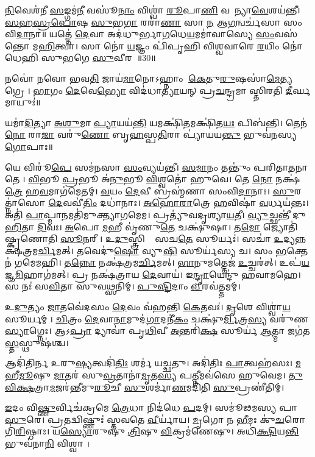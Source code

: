 \ul{𑌨𑌿}𑌵𑍇𑌶॑𑌨𑍀 \ul{𑌸}𑌙𑍍𑌗𑌮॑\ul{𑌨𑍀} 𑌵𑌸𑍂॑\ul{𑌨𑌾𑌂} 𑌵𑌿𑌶𑍍𑌵𑌾॑ \ul{𑌰𑍂}𑌪𑌾\ul{𑌣𑌿} 𑌵𑌸𑍂᳚𑌨𑍍𑌯𑌾\ul{𑌵𑍇}𑌶𑌯॑𑌨𑍍𑌤𑍀। 
\ul{𑌸}\ul{𑌹}\ul{𑌸𑍍𑌰}\ul{𑌪𑍋}𑌷 \ul{𑌸𑍁}𑌭\ul{𑌗𑌾} 𑌰𑌰𑌾॑\ul{𑌣𑌾} 𑌸𑌾 \ul{𑌨} 𑌆\ul{𑌗}𑌨𑍍𑌵𑌰𑍍𑌚॑𑌸𑌾 𑌸𑌂𑌵𑌿\ul{𑌦𑌾}𑌨𑌾॥ 𑌯𑌤𑍍𑌤𑍇॑ \ul{𑌦𑍇}𑌵𑌾 𑌅𑌦॑𑌧𑍁𑌰𑍍𑌭𑌾\ul{𑌗}𑌧𑍇\ul{𑌯}𑌮𑌮𑌾॑𑌵𑌾𑌸𑍍𑌯𑍇 \ul{𑌸𑌂}𑌵𑌸॑𑌨𑍍𑌤𑍋 𑌮\ul{𑌹𑌿}𑌤𑍍𑌵𑌾। 
𑌸𑌾 𑌨𑍋॑ \ul{𑌯}𑌜𑍍𑌞𑌂 𑌪𑌿॑𑌪𑍃𑌹𑌿 𑌵𑌿𑌶𑍍𑌵𑌵𑌾𑌰𑍇 \ul{𑌰}𑌯𑌿𑌂 𑌨𑍋॑ 𑌧𑍇𑌹𑌿 𑌸𑍁𑌭𑌗𑍇 \ul{𑌸𑍁}𑌵𑍀𑌰𑌮𑍍᳚॥30॥ 

\closesection


𑌨𑌵𑍋॑ 𑌨𑌵𑍋 𑌭𑌵\ul{𑌤𑌿} 𑌜𑌾𑌯॑\ul{𑌮𑌾}𑌨𑍋𑌽𑌹𑍍𑌨𑌾𑌂 \ul{𑌕𑍇}𑌤𑍁\ul{𑌰𑍁}𑌷𑌸𑌾॑\ul{𑌮𑍇}𑌤𑍍𑌯𑌗𑍍𑌰𑍇।
\ul{𑌭𑌾}𑌗𑌂 \ul{𑌦𑍇}𑌵𑍇\ul{𑌭𑍍𑌯𑍋} 𑌵𑌿𑌦॑𑌧𑌾\ul{𑌤𑍍𑌯𑌾}𑌯𑌨𑍍 𑌪𑍍𑌰\ul{𑌚}𑌨𑍍𑌦𑍍𑌰𑌮𑌾𑌸𑍍𑌤𑌿𑌰𑌤𑌿 \ul{𑌦𑍀}𑌰𑍍𑌘𑌮𑌾𑌯𑍁𑌃॑॥

𑌯𑌮𑌾॑\ul{𑌦𑌿}𑌤𑍍𑌯𑌾 \ul{𑌅}\ul{}\ul{𑌶𑍁}𑌮𑌾\ul{𑌪𑍍𑌯𑌾}𑌯𑌯॑\ul{𑌨𑍍𑌤𑌿} 𑌯𑌮𑌕𑍍𑌷𑌿॑\ul{𑌤}𑌮𑌕𑍍𑌷𑌿॑𑌤\ul{𑌯𑌃} 𑌪𑌿𑌬॑𑌨𑍍𑌤𑌿।
𑌤𑍇𑌨॑ \ul{𑌨𑍋} 𑌰𑌾\ul{𑌜𑌾} 𑌵𑌰𑍁॑\ul{𑌣𑍋} 𑌬𑍃\ul{𑌹}𑌸𑍍𑌪\ul{𑌤𑌿}𑌰𑌾 𑌪𑍍𑌯𑌾॑𑌯𑌯\ul{𑌨𑍍𑌤𑍁} 𑌭𑍁𑌵॑𑌨𑌸𑍍𑌯 \ul{𑌗𑍋}𑌪𑌾𑌃॥

𑌯𑍇 𑌵𑌿𑌰𑍂॑\ul{𑌪𑍇} 𑌸𑌮॑𑌨𑌸𑌾 \ul{𑌸𑌂}𑌵𑍍𑌯𑌯॑𑌨𑍍𑌤𑍀। \ul{𑌸}\ul{𑌮𑌾}𑌨𑌂 𑌤𑌨𑍍𑌤𑍁𑌂॑ 𑌪𑌰𑌿𑌤𑌾\ul{𑌤}𑌨𑌾𑌤𑍇।
\ul{𑌵𑌿}𑌭𑍂 \ul{𑌪𑍍𑌰}𑌭𑍂 𑌅॑\ul{𑌨𑍁}𑌭𑍂 \ul{𑌵𑌿}𑌶𑍍𑌵𑌤𑍋॑ 𑌹𑍁𑌵𑍇। 𑌤𑍇 \ul{𑌨𑍋} 𑌨𑌕𑍍𑌷॑\ul{𑌤𑍍𑌰𑍇} 𑌹\ul{𑌵}𑌮𑌾𑌗॑𑌮𑍇𑌤𑌮𑍍।
\ul{𑌵}𑌯𑌂 \ul{𑌦𑍇}𑌵𑍀 𑌬𑍍𑌰𑌹𑍍𑌮॑𑌣𑌾 𑌸𑌂𑌵𑌿\ul{𑌦𑌾}𑌨𑌾𑌃। \ul{𑌸𑍁}𑌰𑌤𑍍𑌨𑌾॑𑌸𑍋 \ul{𑌦𑍇}𑌵𑌵𑍀॑\ul{𑌤𑌿𑌂} 𑌦𑌧𑌾॑𑌨𑌾𑌃।
\ul{𑌅}\ul{𑌹𑍋}\ul{𑌰𑌾}𑌤𑍍𑌰𑍇 \ul{𑌹}𑌵𑌿𑌷𑌾॑ \ul{𑌵}𑌰𑍍𑌧𑌯॑𑌨𑍍𑌤𑌃। 𑌅𑌤𑌿॑ \ul{𑌪𑌾}𑌪𑍍𑌮𑌾\ul{𑌨}𑌮𑌤𑌿॑𑌮𑍁𑌕𑍍𑌤𑍍𑌯𑌾𑌗𑌮𑍇𑌮।
𑌪𑍍𑌰𑌤𑍍𑌯𑍁॑𑌵𑌦𑍃𑌶𑍍𑌯𑌾\ul{𑌯}𑌤𑍀। \ul{𑌵𑍍𑌯𑍁}𑌚𑍍𑌛𑌨𑍍𑌤𑍀॑ 𑌦𑍁\ul{𑌹𑌿}𑌤𑌾 \ul{𑌦𑌿}𑌵𑌃।
\ul{𑌅}𑌪𑍋 \ul{𑌮}𑌹𑍀 𑌵𑍃॑𑌣𑍁\ul{𑌤𑍇} 𑌚𑌕𑍍𑌷𑍁॑𑌷𑌾। 𑌤\ul{𑌮𑍋} 𑌜𑍍𑌯𑍋𑌤𑌿॑𑌷𑍍𑌕𑍃𑌣𑍋𑌤𑌿 \ul{𑌸𑍂}𑌨𑌰𑍀।
𑌉\ul{𑌦𑍁}𑌸𑍍𑌤𑍍𑌰𑌿𑌯𑌾𑌃᳚ 𑌸𑌚\ul{𑌤𑍇} 𑌸𑍂𑌰𑍍𑌯𑌃॑। 𑌸𑌚𑌾॑ \ul{𑌉}𑌦𑍍𑌯𑌨𑍍𑌨𑌕𑍍𑌷॑𑌤𑍍𑌰𑌮\ul{𑌰𑍍𑌚𑌿}𑌮𑌤𑍍।
𑌤𑌵𑍇𑌦𑍁॑\ul{𑌷𑍋} 𑌵𑍍𑌯𑍁\ul{𑌷𑌿} 𑌸𑍂𑌰𑍍𑌯॑𑌸𑍍𑌯 𑌚। 𑌸𑌂 \ul{𑌭}𑌕𑍍𑌤𑍇𑌨॑ 𑌗𑌮𑍇𑌮𑌹𑌿।
𑌤\ul{𑌨𑍍𑌨𑍋} 𑌨𑌕𑍍𑌷॑𑌤𑍍𑌰𑌮\ul{𑌰𑍍𑌚𑌿}𑌮𑌤𑍍। \ul{𑌭𑌾}𑌨𑍁𑌮𑌤𑍍𑌤𑍇𑌜॑ \ul{𑌉}𑌚𑍍𑌚𑌰॑𑌤𑍍।
𑌉𑌪॑\ul{𑌯}𑌜𑍍𑌞\ul{𑌮𑌿}𑌹𑌾𑌗॑𑌮𑌤𑍍।
𑌪𑍍𑌰 𑌨𑌕𑍍𑌷॑𑌤𑍍𑌰𑌾𑌯 \ul{𑌦𑍇}𑌵𑌾𑌯॑। 𑌇\ul{𑌨𑍍𑌦𑍍𑌰𑌾}𑌯𑍇𑌨𑍍𑌦𑍁॑ 𑌹𑌵𑌾𑌮𑌹𑍇।
𑌸 𑌨𑌃॑ 𑌸\ul{𑌵𑌿}𑌤𑌾 𑌸𑍁॑𑌵\ul{𑌥𑍍𑌸}𑌨𑌿𑌮𑍍। \ul{𑌪𑍁}\ul{𑌷𑍍𑌟𑌿}𑌦𑌾𑌂 \ul{𑌵𑍀}𑌰𑌵॑𑌤𑍍𑌤𑌮𑌮𑍍।


𑌉\ul{𑌦𑍁}𑌤𑍍𑌯𑌂 \ul{𑌜𑌾}𑌤𑌵𑍇॑𑌦𑌸𑌂 \ul{𑌦𑍇}𑌵𑌂 𑌵॑𑌹𑌨𑍍𑌤𑌿 \ul{𑌕𑍇}𑌤𑌵𑌃॑। \ul{𑌦𑍃}𑌶𑍇 𑌵𑌿𑌶𑍍𑌵𑌾॑\ul{𑌯} 𑌸𑍂𑌰𑍍𑌯𑌮𑍍।
\ul{𑌚𑌿}𑌤𑍍𑌰𑌂 \ul{𑌦𑍇}𑌵𑌾\ul{𑌨𑌾}𑌮𑍁𑌦॑\ul{𑌗𑌾}𑌦𑌨𑍀॑\ul{𑌕𑌂} 𑌚𑌕𑍍𑌷𑍁॑\ul{𑌰𑍍𑌮𑌿}𑌤𑍍𑌰\ul{𑌸𑍍𑌯} 𑌵𑌰𑍁॑𑌣\ul{𑌸𑍍𑌯𑌾}𑌗𑍍𑌨𑍇𑌃।
𑌆𑌽\ul{𑌪𑍍𑌰𑌾} 𑌦𑍍𑌯𑌾𑌵𑌾॑ 𑌪𑍃\ul{𑌥𑌿}𑌵𑍀 \ul{𑌅}𑌨𑍍𑌤𑌰𑌿॑\ul{𑌕𑍍𑌷}\ul{} 𑌸𑍂𑌰𑍍𑌯॑ \ul{𑌆}𑌤𑍍𑌮𑌾 𑌜𑌗॑𑌤\ul{𑌸𑍍𑌤}𑌸𑍍𑌥𑍁𑌷॑𑌶𑍍𑌚।


𑌆𑌦𑌿॑𑌤𑌿𑌰𑍍𑌨 𑌉𑌰𑍁\ul{𑌷𑍍𑌯}𑌤𑍍𑌵𑌦𑌿॑\ul{𑌤𑌿𑌃} 𑌶𑌰𑍍𑌮॑ 𑌯𑌚𑍍𑌛𑌤𑍁। 𑌅𑌦𑌿॑𑌤𑌿𑌃 \ul{𑌪𑌾}𑌤𑍍𑌵𑌹॑𑌸𑌃।
\ul{𑌮}𑌹𑍀\ul{𑌮𑍂}𑌷𑍁 \ul{𑌮𑌾}𑌤𑌰॑ 𑌸𑍁\ul{𑌵𑍍𑌰}𑌤𑌾𑌨𑌾॑\ul{𑌮𑍃}𑌤\ul{𑌸𑍍𑌯} 𑌪\ul{𑌤𑍍𑌨𑍀}𑌮𑌵॑𑌸𑍇 𑌹𑍁𑌵𑍇𑌮।
\ul{𑌤𑍁}\ul{𑌵𑌿}\ul{𑌕𑍍𑌷}𑌤𑍍𑌰𑌾\ul{𑌮}𑌜𑌰॑𑌨𑍍𑌤𑍀𑌮𑍁\ul{𑌰𑍂}𑌚𑍀 \ul{𑌸𑍁}𑌶𑌰𑍍𑌮𑌾॑\ul{𑌣}\-𑌮𑌦𑌿॑𑌤𑌿 \ul{𑌸𑍁}𑌪𑍍𑌰𑌣𑍀॑𑌤𑌿𑌮𑍍।


\ul{𑌇}𑌦𑌂 𑌵𑌿\ul{𑌷𑍍𑌣𑍁}𑌰𑍍𑌵𑌿𑌚॑𑌕𑍍𑌰𑌮𑍇 \ul{𑌤𑍍𑌰𑍇}𑌧𑌾 𑌨𑌿𑌦॑𑌧𑍇 \ul{𑌪}𑌦𑌮𑍍। 𑌸𑌮𑍂॑𑌢𑌮𑌸𑍍𑌯 𑌪𑌾\ul{𑌸𑍁}𑌰𑍇।
𑌪𑍍𑌰𑌤𑌦𑍍𑌵𑌿𑌷𑍍𑌣𑍁𑌃॑ 𑌸𑍍𑌤𑌵𑌤𑍇 \ul{𑌵𑍀}𑌰𑍍𑌯𑌾॑𑌯। \ul{𑌮𑍃}𑌗𑍋 𑌨 \ul{𑌭𑍀}𑌮𑌃 𑌕𑍁॑\ul{𑌚}𑌰𑍋 𑌗𑌿॑\ul{𑌰𑌿}𑌷𑍍𑌠𑌾𑌃।
𑌯\ul{𑌸𑍍𑌯𑍋}𑌰𑍁𑌷𑍁॑ \ul{𑌤𑍍𑌰𑌿}𑌷𑍁 \ul{𑌵𑌿}𑌕𑍍𑌰𑌮॑𑌣𑍇𑌷𑍁। 𑌅𑌧𑌿॑\ul{𑌕𑍍𑌷𑌿}𑌯\ul{𑌨𑍍𑌤𑌿} 𑌭𑍁𑌵॑𑌨𑌾\ul{𑌨𑌿} 𑌵𑌿𑌶𑍍𑌵𑌾।

